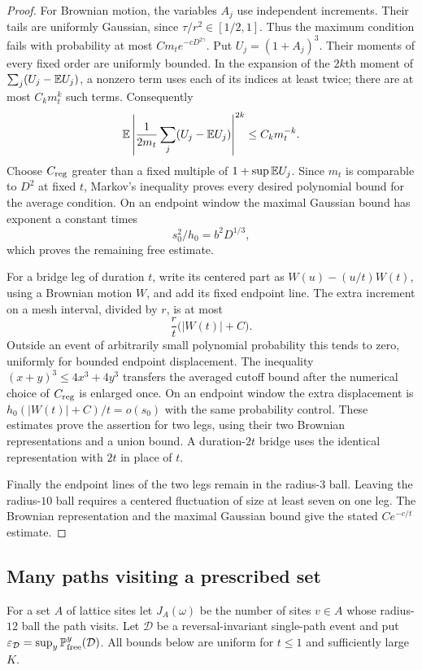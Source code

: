 \begin{proof}
For Brownian motion, the variables $A_j$ use independent increments.
Their tails are uniformly Gaussian, since $\tau/r^2\in[1/2,1]$.
Thus the maximum condition fails with probability at most
$C m_t e^{-cD^{2\gamma}}$.  Put $U_j=(1+A_j)^3$.
Their moments of every fixed order are uniformly bounded.  In the
expansion of the $2k$th moment of
$\sum_j(U_j-\mathbb E U_j)$, a nonzero term uses each of its indices at
least twice; there are at most $C_k m_t^k$ such terms.  Consequently
\[
 \mathbb E\left|\frac1{2m_t}\sum_j(U_j-\mathbb E U_j)\right|^{2k}
 \le C_k m_t^{-k}.
\]
Choose $C_{\rm reg}$ greater than a fixed multiple of
$1+\sup\mathbb E U_j$.  Since $m_t$ is comparable to $D^2$ at fixed $t$,
Markov's inequality proves every desired polynomial bound for the
average condition.  On an endpoint window the maximal Gaussian bound
has exponent a constant times
\[
 s_0^2/h_0=b^2D^{1/3},
\]
which proves the remaining free estimate.

For a bridge leg of duration $t$, write its centered part as
$W(u)-(u/t)W(t)$, using a Brownian motion $W$, and add its fixed
endpoint line.  The extra increment on a mesh interval, divided by
$r$, is at most
\[
 \frac{r}{t}\bigl(|W(t)|+C\bigr).
\]
Outside an event of arbitrarily small polynomial probability this
tends to zero, uniformly for bounded endpoint displacement.  The
inequality $(x+y)^3\le4x^3+4y^3$ transfers the averaged cutoff bound
after the numerical choice of $C_{\rm reg}$ is enlarged once.
On an endpoint window the extra displacement is
$h_0(|W(t)|+C)/t=o(s_0)$ with the same probability control.
These estimates prove the assertion for two legs, using their two
Brownian representations and a union bound.  A duration-$2t$ bridge
uses the identical representation with $2t$ in place of $t$.

Finally the endpoint lines of the two legs remain in the radius-$3$
ball.  Leaving the radius-$10$ ball requires a centered fluctuation
of size at least seven on one leg.  The Brownian representation and
the maximal Gaussian bound give the stated $Ce^{-c/t}$ estimate.
\end{proof}

\subsection{Many paths visiting a prescribed set}

For a set $A$ of lattice sites let $J_A(\omega)$ be the number of
sites $v\in A$ whose radius-$12$ ball the path visits.  Let $\mathcal D$
be a reversal-invariant single-path event and put
$\varepsilon_{\mathcal D}=\sup_y\mathbb P^y_{\rm free}(\mathcal D)$.
All bounds below are uniform for $t\le1$ and sufficiently large $K$.

